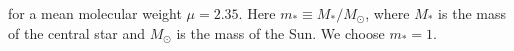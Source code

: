 \documentclass[apj]{emulateapj}
\begin{document}
\noindent for a mean molecular weight $\mu=2.35$. Here $m_* \equiv M_*/M_{\odot}$, where $M_*$ is the mass of the central star and $M_{\odot}$ is the mass of the Sun. We choose $m_*=1$. 

%
%
%
%
%
%
%
%
%
%
%
%
%
\end{document}
